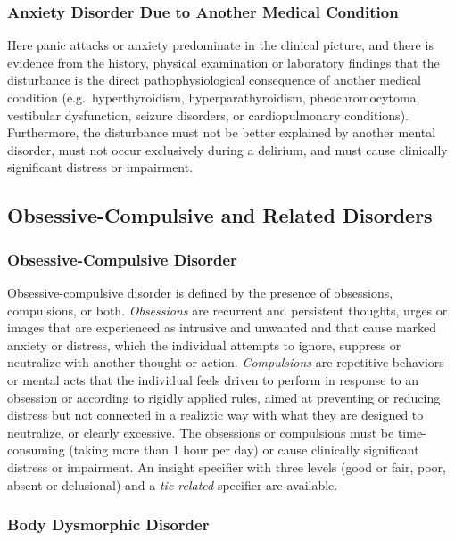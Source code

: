 \subsubsection{Anxiety Disorder Due to Another Medical Condition}

Here panic attacks or anxiety predominate in the clinical picture, and there is
evidence from the history, physical examination or laboratory findings that the
disturbance is the direct pathophysiological consequence of another medical
condition (e.g.\ hyperthyroidism, hyperparathyroidism, pheochromocytoma,
vestibular dysfunction, seizure disorders, or cardiopulmonary conditions). Furthermore, the disturbance must not be better explained by another mental disorder, must not
occur exclusively during a delirium, and must cause clinically significant
distress or impairment.

\subsection{Obsessive-Compulsive and Related Disorders}

\subsubsection{Obsessive-Compulsive Disorder}

Obsessive-compulsive disorder is defined by the presence of obsessions,
compulsions, or both. \emph{Obsessions} are recurrent and persistent thoughts,
urges or images that are experienced as intrusive and unwanted and that cause
marked anxiety or distress, which the individual attempts to ignore, suppress or
neutralize with another thought or action. \emph{Compulsions} are repetitive
behaviors or mental acts that the individual feels driven to perform in response
to an obsession or according to rigidly applied rules, aimed at preventing or
reducing distress but not connected in a realiztic way with what they are
designed to neutralize, or clearly excessive. The obsessions or compulsions must
be time-consuming (taking more than 1 hour per day) or cause clinically
significant distress or impairment. An insight specifier with three
levels (good or fair, poor, absent or delusional) and a \emph{tic-related}
specifier are available.

\subsubsection{Body Dysmorphic Disorder}

